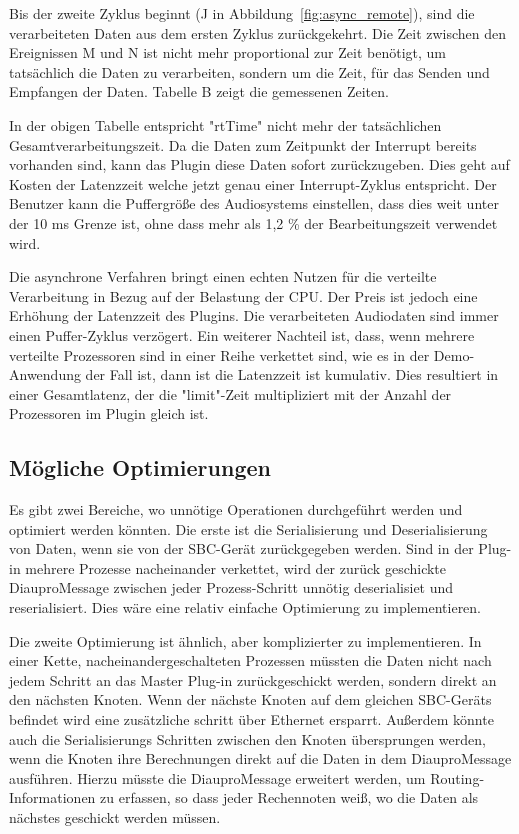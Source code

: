 Bis der zweite Zyklus beginnt (J in Abbildung~\ref{fig:async_remote}), sind die verarbeiteten Daten aus dem ersten Zyklus zurückgekehrt. Die Zeit zwischen den Ereignissen M und N ist nicht mehr proportional zur Zeit benötigt, um tatsächlich die Daten zu verarbeiten, sondern um die Zeit, für das Senden und Empfangen der Daten. Tabelle B zeigt die gemessenen Zeiten.



In der obigen Tabelle entspricht "rtTime" nicht mehr der tatsächlichen Gesamtverarbeitungszeit. Da die Daten zum Zeitpunkt der Interrupt bereits vorhanden sind, kann das Plugin diese Daten sofort zurückzugeben. Dies geht auf Kosten der Latenzzeit welche jetzt genau einer Interrupt-Zyklus entspricht. Der Benutzer kann die Puffergröße des Audiosystems einstellen, dass dies weit unter der 10 ms Grenze ist, ohne dass mehr als 1,2 \% der Bearbeitungszeit verwendet wird.

Die asynchrone Verfahren bringt einen echten Nutzen für die verteilte Verarbeitung in Bezug auf der Belastung der CPU. Der Preis ist jedoch eine Erhöhung der Latenzzeit des Plugins. Die verarbeiteten Audiodaten sind immer einen Puffer-Zyklus verzögert. Ein weiterer Nachteil ist, dass, wenn mehrere verteilte Prozessoren sind in einer Reihe verkettet sind, wie es in der Demo-Anwendung der Fall ist, dann ist die Latenzzeit ist kumulativ. Dies resultiert in einer Gesamtlatenz, der die "limit"-Zeit multipliziert mit der Anzahl der Prozessoren im Plugin gleich ist.

\subsection{Mögliche Optimierungen}

Es gibt zwei Bereiche, wo unnötige Operationen durchgeführt werden und optimiert werden könnten. Die erste ist die Serialisierung und Deserialisierung von Daten, wenn sie von der SBC-Gerät zurückgegeben werden. Sind in der Plug-in mehrere Prozesse nacheinander verkettet, wird der zurück  geschickte DiauproMessage zwischen jeder Prozess-Schritt unnötig deserialisiet und reserialisiert. Dies wäre eine relativ einfache Optimierung zu implementieren.

Die zweite Optimierung ist ähnlich, aber komplizierter zu implementieren. In einer Kette, nacheinandergeschalteten Prozessen müssten die Daten nicht nach jedem Schritt an das Master Plug-in zurückgeschickt werden, sondern direkt an den nächsten Knoten. Wenn der nächste Knoten auf dem gleichen SBC-Geräts befindet wird eine zusätzliche schritt über Ethernet ersparrt. Außerdem könnte auch die Serialisierungs Schritten zwischen den Knoten übersprungen werden, wenn die Knoten ihre Berechnungen direkt auf die Daten in dem DiauproMessage ausführen. Hierzu müsste die DiauproMessage erweitert werden, um Routing-Informationen zu erfassen, so dass jeder Rechennoten weiß, wo die Daten als nächstes geschickt werden müssen.

